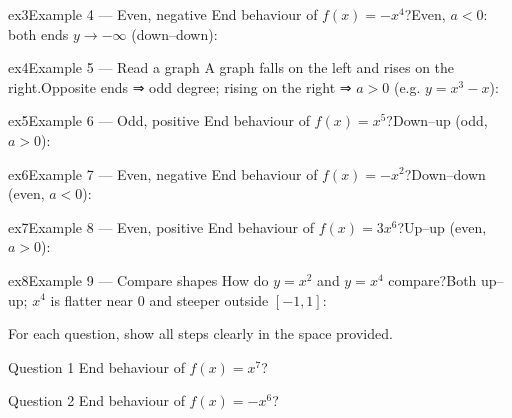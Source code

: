 \documentclass[11pt]{article}
\begin{document}
\begin{example}{ex3}{Example 4 --- Even, negative}
End behaviour of $f(x)=-x^4$?\soln Even, $a<0$: both ends $y\to-\infty$ (down–down):
\end{example}

\begin{example}{ex4}{Example 5 --- Read a graph}
A graph falls on the left and rises on the right.\soln Opposite ends ⇒ odd degree; rising on the right ⇒ $a>0$ (e.g. $y=x^3-x$):
\end{example}

\begin{example}{ex5}{Example 6 --- Odd, positive}
End behaviour of $f(x)=x^5$?\soln Down–up (odd, $a>0$):
\end{example}

\begin{example}{ex6}{Example 7 --- Even, negative}
End behaviour of $f(x)=-x^2$?\soln Down–down (even, $a<0$):
\end{example}

\begin{example}{ex7}{Example 8 --- Even, positive}
End behaviour of $f(x)=3x^6$?\soln Up–up (even, $a>0$):
\end{example}

\begin{example}{ex8}{Example 9 --- Compare shapes}
How do $y=x^2$ and $y=x^4$ compare?\soln Both up–up; $x^4$ is flatter near 0 and steeper outside $[-1,1]$:
\end{example}

\clearpage
{}
For each question, show all steps clearly in the space provided.

\begin{qbox}{Question 1}
End behaviour of $f(x)=x^7$?\workspace{2.4cm}
\end{qbox}

\begin{qbox}{Question 2}
End behaviour of $f(x)=-x^6$?\workspace{2.4cm}
\end{qbox}
\end{document}
